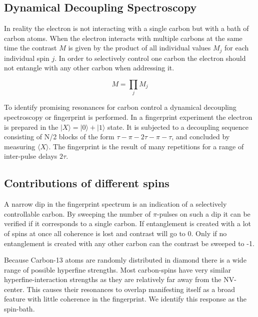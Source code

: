 \subsection*{Dynamical Decoupling Spectroscopy}
In reality the electron is not interacting with a single carbon but with a bath of carbon atoms. When the electron interacts with multiple carbons at the same time the contrast $M$ is given by the product of all individual values $M_j$ for each individual spin $j$. In order to selectively control one carbon the electron should not entangle with any other carbon when addressing it.

\begin{equation}
\label{eq:prod_multiple_spins}
    M = \prod_{j}{M_j}
\end{equation}

To identify promising resonances for carbon control a dynamical decoupling spectroscopy\citep{Taminiau2012Detection} or fingerprint is performed. In a fingerprint experiment the electron is prepared in the $|X\rangle = |0\rangle +|1\rangle$ state. It is subjected to a decoupling sequence consisting of N/2 blocks of the form {$\tau - \pi -2\tau-\pi-\tau$}, and concluded by measuring $\langle X\rangle $. The fingerprint is the result of many repetitions for a range of inter-pulse delays $2\tau$.

\subsection*{Contributions of different spins }%

A narrow dip in the fingerprint spectrum is an indication of a selectively controllable carbon.
By sweeping the number of $\pi$-pulses on such a dip it can be verified if it corresponds to a single carbon. If entanglement is created with a lot of spins at once all coherence is lost and contrast will go to 0. Only if no entanglement is created with any other carbon can the contrast be sweeped to -1. %

Because Carbon-13 atoms are randomly distributed in diamond there is a wide range of possible hyperfine strengths.
Most carbon-spins have very similar hyperfine-interaction strengths as they are relatively far away from the NV-center. This causes their resonances to overlap manifesting itself as a broad feature with little coherence in the fingerprint. We identify this response as the spin-bath.

